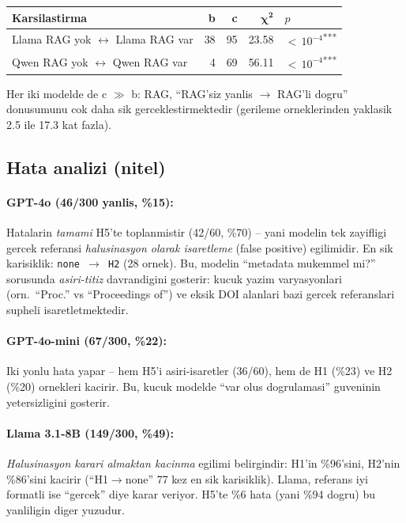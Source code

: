 \documentclass[11pt,a4paper]{article}
\begin{document}
\begin{tabularx}{\columnwidth}{X r r r l}
\toprule
\textbf{Karsilastirma} & \textbf{b} & \textbf{c} & $\boldsymbol{\chi^2}$ & \textbf{$p$} \\
\midrule
Llama RAG yok $\leftrightarrow$ Llama RAG var & 38 & 95 & 23.58 & ${<}\,10^{-4}$\;\textsuperscript{***} \\
Qwen RAG yok $\leftrightarrow$ Qwen RAG var   &  4 & 69 & 56.11 & ${<}\,10^{-4}$\;\textsuperscript{***} \\
\bottomrule
\end{tabularx}

\noindent Her iki modelde de c $\gg$ b: RAG, ``RAG'siz yanlis $\to$ RAG'li
dogru'' donusumunu cok daha sik gerceklestirmektedir (gerileme orneklerinden
yaklasik 2.5 ile 17.3 kat fazla).

\subsection{Hata analizi (nitel)}
\paragraph{GPT-4o (46/300 yanlis, \%15):} Hatalarin \emph{tamami} H5'te
toplanmistir (42/60, \%70) -- yani modelin tek zayifligi gercek referansi
\emph{halusinasyon olarak isaretleme} (false positive) egilimidir. En sik
karisiklik: \texttt{none $\to$ H2} (28 ornek). Bu, modelin ``metadata mukemmel
mi?'' sorusunda \emph{asiri-titiz} davrandigini gosterir: kucuk yazim
varyasyonlari (orn.\ ``Proc.'' vs ``Proceedings of'') ve eksik DOI alanlari
bazi gercek referanslari supheli isaretletmektedir.

\paragraph{GPT-4o-mini (67/300, \%22):} Iki yonlu hata yapar -- hem H5'i
asiri-isaretler (36/60), hem de H1 (\%23) ve H2 (\%20) ornekleri kacirir.
Bu, kucuk modelde ``var olus dogrulamasi'' guveninin yetersizligini gosterir.

\paragraph{Llama 3.1-8B (149/300, \%49):} \emph{Halusinasyon karari almaktan
kacinma} egilimi belirgindir: H1'in \%96'sini, H2'nin \%86'sini kacirir
(``H1$\to$none'' 77 kez en sik karisiklik). Llama, referans iyi formatli
ise ``gercek'' diye karar veriyor. H5'te \%6 hata (yani \%94 dogru) bu
yanliligin diger yuzudur.
\end{document}
